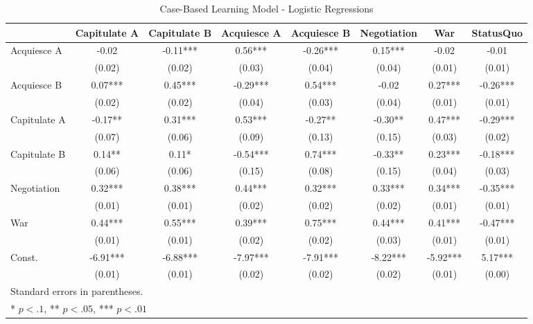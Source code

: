 \begin{landscape}
\begin{table}
	\begin{center}
	\caption{Case-Based Learning Model - Logistic Regressions}
	\label{table:cb_regressions}
	\begin{tabular}{lccccccc}
	\hline
	             & Capitulate A & Capitulate B & Acquiesce A & Acquiesce B & Negotiation & War      & StatusQuo   \\
	\hline
	Acquiesce A  & -0.02        & -0.11***     & 0.56***     & -0.26***    & 0.15***     & -0.02    & -0.01      \\
	             & (0.02)       & (0.02)       & (0.03)      & (0.04)      & (0.04)      & (0.01)   & (0.01)     \\
	Acquiesce B  & 0.07***      & 0.45***      & -0.29***    & 0.54***     & -0.02       & 0.27***  & -0.26***   \\
	             & (0.02)       & (0.02)       & (0.04)      & (0.03)      & (0.04)      & (0.01)   & (0.01)     \\
	Capitulate A & -0.17**      & 0.31***      & 0.53***     & -0.27**     & -0.30**     & 0.47***  & -0.29***   \\
	             & (0.07)       & (0.06)       & (0.09)      & (0.13)      & (0.15)      & (0.03)   & (0.02)     \\
	Capitulate B & 0.14**       & 0.11*        & -0.54***    & 0.74***     & -0.33**     & 0.23***  & -0.18***   \\
	             & (0.06)       & (0.06)       & (0.15)      & (0.08)      & (0.15)      & (0.04)   & (0.03)     \\
	Negotiation  & 0.32***      & 0.38***      & 0.44***     & 0.32***     & 0.33***     & 0.34***  & -0.35***   \\
	             & (0.01)       & (0.01)       & (0.02)      & (0.02)      & (0.02)      & (0.01)   & (0.01)     \\
	War          & 0.44***      & 0.55***      & 0.39***     & 0.75***     & 0.44***     & 0.41***  & -0.47***   \\
	             & (0.01)       & (0.01)       & (0.02)      & (0.02)      & (0.03)      & (0.01)   & (0.01)     \\
	Const.       & -6.91***     & -6.88***     & -7.97***    & -7.91***    & -8.22***    & -5.92*** & 5.17***    \\
	             & (0.01)       & (0.01)       & (0.02)      & (0.02)      & (0.02)      & (0.01)   & (0.00)     \\
	\hline
	\hline
	\multicolumn{8}{l}{Standard errors in parentheses.} \\
	\multicolumn{8}{l}{* $p<.1$, ** $p<.05$, *** $p<.01$} \\
	\end{tabular}
	\end{center}
	\tableSpace
\end{table}

\end{landscape}

